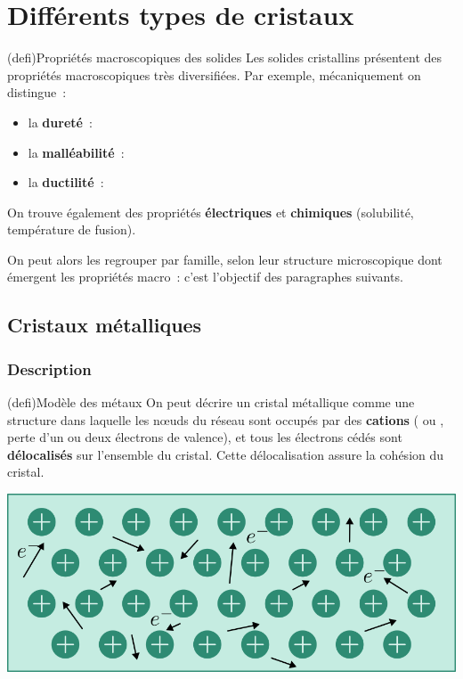 \documentclass[../../main/main.tex]{subfiles}
\begin{document}
\section{Différents types de cristaux}
\begin{tcb*}[list entry={\lte Propriétés macro.\ des solides}](defi){Propriétés macroscopiques des solides}
	Les solides cristallins présentent des propriétés macroscopiques très
	diversifiées. Par exemple, mécaniquement on distingue~:
	\begin{itemize}
		\item la \textbf{dureté}~: 
		\item la \textbf{malléabilité}~: 
		\item la \textbf{ductilité}~: 
	\end{itemize}
	On trouve également des propriétés \textbf{électriques} et \textbf{chimiques}
	(solubilité, température de fusion).
\end{tcb*}

On peut alors les regrouper par famille, selon leur structure microscopique dont
émergent les propriétés macro~: c'est l'objectif des paragraphes suivants.

\subsection{Cristaux métalliques}
\subsubsection{Description}
\begin{tcb*}[sidebyside, righthand ratio=.4](defi){Modèle des métaux}
	On peut décrire un cristal métallique comme une structure dans laquelle les
	nœuds du réseau sont occupés par des \textbf{cations} ( ou ,
	perte d'un ou deux électrons de valence), et tous les électrons cédés sont
	\textbf{délocalisés} sur l'ensemble du cristal. Cette délocalisation assure la
	cohésion du cristal.
	\tcblower
	\begin{center}
		\includegraphics[width=\linewidth]{metal_mod}
	\end{center}
\end{tcb*}
\end{document}

